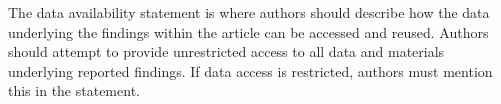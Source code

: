 \documentclass{ametsocV5}
\begin{document}
% 
%
\datastatement
The data availability statement is where authors should describe how the data underlying 
the findings within the article can be accessed and reused. Authors should attempt to 
provide unrestricted access to all data and materials underlying reported findings. 
If data access is restricted, authors must mention this in the statement.

%






%
%
%
% 
% 
\end{document}
